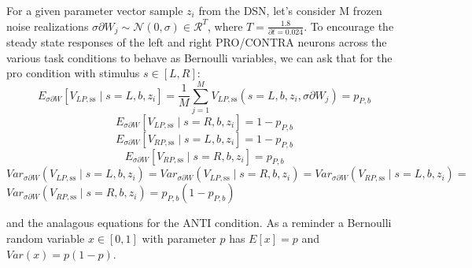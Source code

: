 \documentclass[11pt]{article}
\begin{document}
For a given parameter vector sample $z_i$ from the DSN, let's consider M frozen noise realizations $\sigma \partial W_j \sim \mathcal{N}(0, \sigma) \in \mathcal{R}^T$, where $T = \frac{1.8}{\partial t = 0.024}$.  To encourage the steady state responses of the left and right PRO/CONTRA neurons across the various task conditions to behave as Bernoulli variables, we can ask that for the pro condition with stimulus $s \in \left[L, R\right]$:
\[ E_{\sigma \partial W} \left[ V_{LP,\text{ss}} \mid s=L, b, z_i \right] = \frac{1}{M}\sum_{j=1}^M V_{LP,\text{ss}}(s=L, b, z_i, \sigma \partial W_j) =  p_{P, b} \]
\[ E_{\sigma \partial W} \left[ V_{LP,\text{ss}} \mid s=R, b, z_i \right] = 1 - p_{P, b} \]
\[ E_{\sigma \partial W} \left[ V_{RP,\text{ss}} \mid s=L, b, z_i \right] = 1 - p_{P, b} \]
\[ E_{\sigma \partial W} \left[ V_{RP,\text{ss}} \mid s=R, b, z_i \right] = p_{P, b} \]
$Var_{\sigma \partial W}(V_{LP,\text{ss}} \mid s=L, b, z_i) =   Var_{\sigma \partial W}(V_{LP,\text{ss}} \mid s=R, b, z_i) = Var_{\sigma \partial W}(V_{RP,\text{ss}} \mid s=L, b, z_i) = $ \\
$Var_{\sigma \partial W}(V_{RP,\text{ss}} \mid s=R, b, z_i) = p_{P, b}(1 -  p_{P,b})$

and the analagous equations for the ANTI condition.  As a reminder a Bernoulli random variable $x \in \left[0, 1 \right]$ with parameter $p$ has $E\left[x \right] = p$ and $Var(x) = p(1-p)$.
\end{document}
